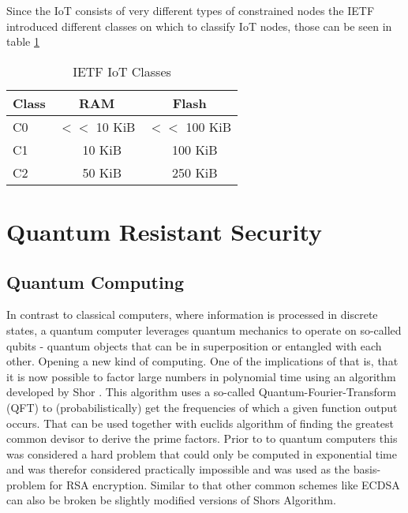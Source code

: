 \documentclass[conference]{IEEEtran}
\begin{document}
Since the IoT consists of very different types of constrained nodes the IETF introduced different classes on which to classify IoT nodes, those can be seen in table \ref{IoT-classes}

\begin{table}
    \label{IoT-classes}
    \centering
    \caption{IETF IoT Classes}
    \begin{tabular}{l | c c}
        Class & RAM & Flash \\
        \hline
        C0 & $<<$ 10 KiB & $<<$ 100 KiB\\
        C1 & ~ 10 KiB & ~ 100 KiB\\
        C2 & ~ 50 KiB & ~ 250 KiB\\
    \end{tabular} 
\end{table}



\section{Quantum Resistant Security}
\subsection{Quantum Computing}\label{l:quantum_computing}
In contrast to classical computers, where information is processed in discrete states, a quantum computer leverages quantum mechanics to operate on so-called qubits - quantum objects that can be in superposition or entangled with each other. 
Opening a new kind of computing. 
One of the implications of that is, that it is now possible to factor large numbers in polynomial time using an algorithm developed by Shor \cite{Shor}. 
This algorithm uses a so-called Quantum-Fourier-Transform (QFT) to (probabilistically) get the frequencies of which a given function output occurs. That can be used together with euclids algorithm of finding the greatest common devisor to derive the prime factors. 
Prior to to quantum computers this was considered a hard problem that could only be computed in exponential time and was therefor considered practically impossible and was used as the basis-problem for RSA encryption.
Similar to that other common schemes like ECDSA can also be broken be slightly modified versions of Shors Algorithm.
\end{document}
